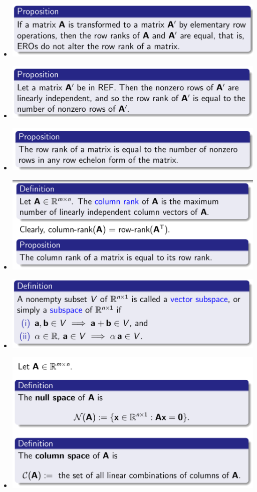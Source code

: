 \documentclass{article}
\begin{document}
\begin{itemize}
  \item \includegraphics[scale = 0.4]{21.png}
  \item \includegraphics[scale = 0.4]{22.png}
  \item \includegraphics[scale = 0.4]{23.png}
  \item \includegraphics[scale = 0.4]{24.png}
  \item \includegraphics[scale = 0.4]{25.png}
  \item \includegraphics[scale = 0.4]{26.png}

\end{itemize}
\end{document}
